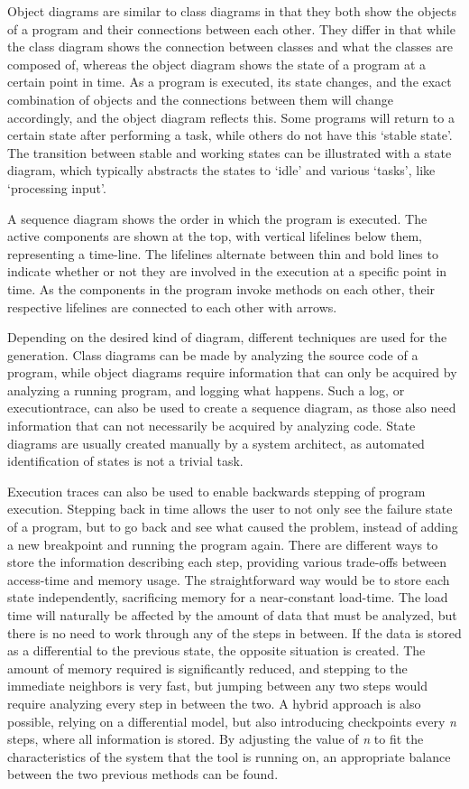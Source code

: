 Object diagrams are similar to class diagrams in that they both show the objects of a program and their connections between each other.
They differ in that while the class diagram shows the connection between classes and what the classes are composed of, whereas the object diagram shows the state of a program at a certain point in time.
As a program is executed, its state changes, and the exact combination of objects and the connections between them will change accordingly, and the object diagram reflects this.
Some programs will return to a certain state after performing a task, while others do not have this `stable state'.
The transition between stable and working states can be illustrated with a state diagram, which typically abstracts the states to `idle' and various `tasks', like `processing input'.

A sequence diagram shows the order in which the program is executed.
The active components are shown  at the top, with vertical \glspl{lifeline} below them, representing a time-line.
The lifelines alternate between thin and bold lines to indicate whether or not they are involved in the execution at a specific point in time.
As the components in the program invoke methods on each other, their respective lifelines are connected to each other with arrows.

Depending on the desired kind of diagram, different techniques are used for the generation.
Class diagrams can be made by analyzing the source code of a program, while object diagrams require information that can only be acquired by analyzing a running program, and logging what happens.
Such a log, or \gls{executiontrace}, can also be used to create a sequence diagram, as those also need information that can not necessarily be acquired by analyzing code.
State diagrams are usually created manually by a system architect, as automated identification of states is not a trivial task.

Execution traces can also be used to enable backwards stepping of program execution.
Stepping back in time allows the user to not only see the failure state of a program, but to go back and see what caused the problem, instead of adding a new \gls{breakpoint} and running the program again.
There are different ways to store the information describing each step, providing various trade-offs between access-time and memory usage.
The straightforward way would be to store each state independently, sacrificing memory for a near-constant load-time.
The load time will naturally be affected by the amount of data that must be analyzed, but there is no need to work through any of the steps in between.
If the data is stored as a differential to the previous state, the opposite situation is created.
The amount of memory required is significantly reduced, and stepping to the immediate neighbors is very fast, but jumping between any two steps would require analyzing every step in between the two.
A hybrid approach is also possible, relying on a differential model, but also introducing checkpoints every \textit{n} steps, where all information is stored.
By adjusting the value of \textit{n} to fit the characteristics of the system that the tool is running on, an appropriate balance between the two previous methods can be found.

